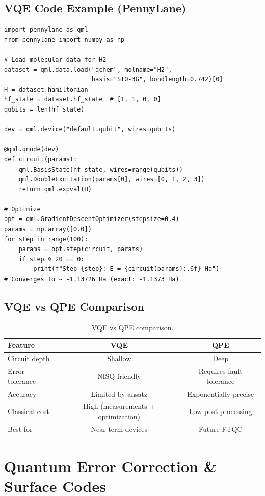 \documentclass[11pt,a4paper]{article}
\begin{document}
\subsection{VQE Code Example (PennyLane)}

\begin{lstlisting}[caption={VQE for H$_2$ with PennyLane}]
import pennylane as qml
from pennylane import numpy as np

# Load molecular data for H2
dataset = qml.data.load("qchem", molname="H2",
                        basis="STO-3G", bondlength=0.742)[0]
H = dataset.hamiltonian
hf_state = dataset.hf_state  # [1, 1, 0, 0]
qubits = len(hf_state)

dev = qml.device("default.qubit", wires=qubits)

@qml.qnode(dev)
def circuit(params):
    qml.BasisState(hf_state, wires=range(qubits))
    qml.DoubleExcitation(params[0], wires=[0, 1, 2, 3])
    return qml.expval(H)

# Optimize
opt = qml.GradientDescentOptimizer(stepsize=0.4)
params = np.array([0.0])
for step in range(100):
    params = opt.step(circuit, params)
    if step % 20 == 0:
        print(f"Step {step}: E = {circuit(params):.6f} Ha")
# Converges to ~ -1.13726 Ha (exact: -1.1373 Ha)
\end{lstlisting}

\subsection{VQE vs QPE Comparison}

\begin{table}[H]
\centering
\begin{tabular}{lcc}
\toprule
\textbf{Feature} & \textbf{VQE} & \textbf{QPE} \\
\midrule
Circuit depth & Shallow & Deep \\
Error tolerance & NISQ-friendly & Requires fault tolerance \\
Accuracy & Limited by ansatz & Exponentially precise \\
Classical cost & High (measurements + optimization) & Low post-processing \\
Best for & Near-term devices & Future FTQC \\
\bottomrule
\end{tabular}
\caption{VQE vs QPE comparison.}
\end{table}


\section{Quantum Error Correction \& Surface Codes}
\end{document}

